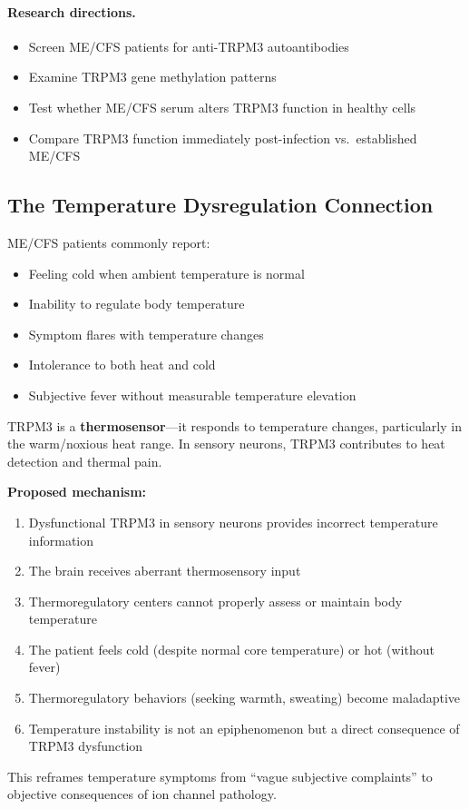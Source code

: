\paragraph{Research directions.}
\begin{itemize}
    \item Screen ME/CFS patients for anti-TRPM3 autoantibodies
    \item Examine TRPM3 gene methylation patterns
    \item Test whether ME/CFS serum alters TRPM3 function in healthy cells
    \item Compare TRPM3 function immediately post-infection vs.\ established ME/CFS
\end{itemize}

\subsection{The Temperature Dysregulation Connection}

\begin{hypothesis}
ME/CFS patients commonly report:
\begin{itemize}
    \item Feeling cold when ambient temperature is normal
    \item Inability to regulate body temperature
    \item Symptom flares with temperature changes
    \item Intolerance to both heat and cold
    \item Subjective fever without measurable temperature elevation
\end{itemize}

TRPM3 is a \textbf{thermosensor}---it responds to temperature changes, particularly in the warm/noxious heat range. In sensory neurons, TRPM3 contributes to heat detection and thermal pain.

\textbf{Proposed mechanism:}
\begin{enumerate}
    \item Dysfunctional TRPM3 in sensory neurons provides incorrect temperature information
    \item The brain receives aberrant thermosensory input
    \item Thermoregulatory centers cannot properly assess or maintain body temperature
    \item The patient feels cold (despite normal core temperature) or hot (without fever)
    \item Thermoregulatory behaviors (seeking warmth, sweating) become maladaptive
    \item Temperature instability is not an epiphenomenon but a direct consequence of TRPM3 dysfunction
\end{enumerate}

This reframes temperature symptoms from ``vague subjective complaints'' to objective consequences of ion channel pathology.
\end{hypothesis}

